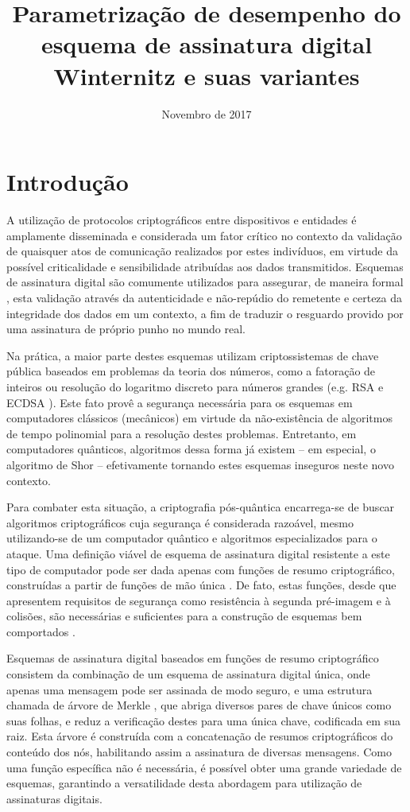 \documentclass{article}
\title{Parametrização de desempenho do esquema de
assinatura digital Winternitz e suas variantes}
\author{Novembro de 2017}
\date{}
\begin{document}
\maketitle

\section{Introdução}

A utilização de protocolos criptográficos entre dispositivos e entidades é
amplamente disseminada e considerada um fator crítico no contexto da validação
de quaisquer atos de comunicação realizados por estes indivíduos, em virtude da
possível criticalidade e sensibilidade atribuídas aos dados transmitidos.
Esquemas de assinatura digital são comumente utilizados para assegurar, de
maneira formal \cite{Goldreich:2004:FCV:975541}, esta validação através da
autenticidade e não-repúdio do remetente e certeza da integridade dos dados em
um contexto, a fim de traduzir o resguardo provido por uma assinatura de
próprio punho no mundo real.

Na prática, a maior parte destes esquemas utilizam criptossistemas de chave
pública baseados em problemas da teoria dos números, como a fatoração de
inteiros ou resolução do logaritmo discreto para números grandes (e.g. RSA
\cite{Rivest:1978:MOD:359340.359342} e ECDSA \cite{Johnson2001}). Este fato
provê a segurança necessária para os esquemas em computadores clássicos
(mecânicos) em virtude da não-existência de algoritmos de tempo polinomial para
a resolução destes problemas. Entretanto, em computadores quânticos, algoritmos
dessa forma já existem -- em especial, o algoritmo de Shor
\cite{Shor:1997:PAP:264393.264406} -- efetivamente tornando estes esquemas
inseguros neste novo contexto. 

Para combater esta situação, a criptografia pós-quântica encarrega-se de buscar
algoritmos criptográficos cuja segurança é considerada razoável, mesmo
utilizando-se de um computador quântico e algoritmos especializados para o
ataque. Uma definição viável de esquema de assinatura digital resistente a este
tipo de computador pode ser dada apenas com funções de resumo criptográfico,
construídas a partir de funções de mão única \cite{cryptoeprint:2005:328}. De
fato, estas funções, desde que apresentem requisitos de segurança como
resistência à segunda pré-imagem e à colisões, são necessárias e suficientes
para a construção de esquemas bem comportados
\cite{Rompel:1990:OFN:100216.100269}.

Esquemas de assinatura digital baseados em funções de resumo criptográfico
consistem da combinação de um esquema de assinatura digital única, onde apenas
uma mensagem pode ser assinada de modo seguro, e uma estrutura chamada de
árvore de Merkle \cite{Merkle:1989:CDS:118209.118230}, que abriga diversos
pares de chave únicos como suas folhas, e reduz a verificação destes para uma
única chave, codificada em sua raiz. Esta árvore é construída com a
concatenação de resumos criptográficos do conteúdo dos nós, habilitando assim a
assinatura de diversas mensagens. Como uma função específica não é necessária,
é possível obter uma grande variedade de esquemas, garantindo a versatilidade
desta abordagem para utilização de assinaturas digitais.
\end{document}

